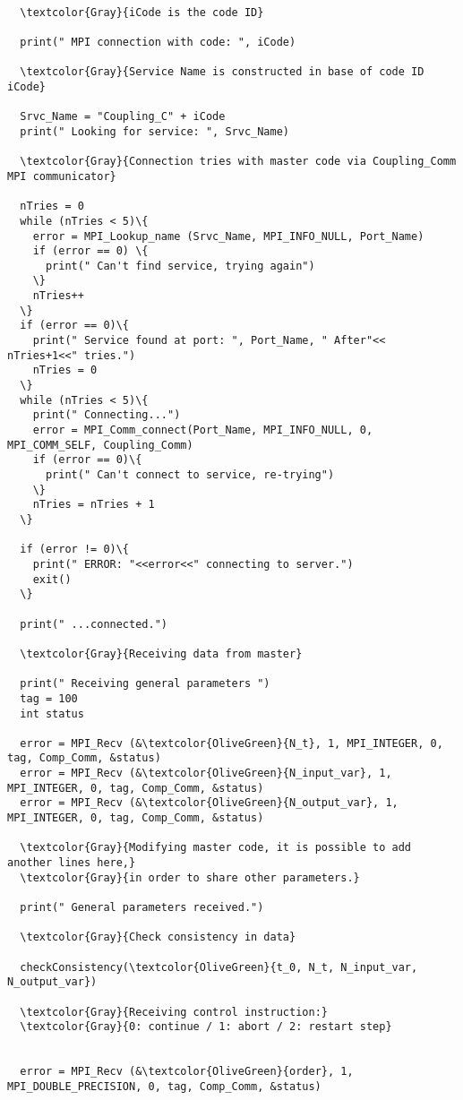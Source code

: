 \begin{Verbatim}[frame=single,commandchars=\\\{\}]

  \textcolor{Gray}{iCode is the code ID}
  
  print(" MPI connection with code: ", iCode)

  \textcolor{Gray}{Service Name is constructed in base of code ID iCode}
  
  Srvc_Name = "Coupling_C" + iCode
  print(" Looking for service: ", Srvc_Name)

  \textcolor{Gray}{Connection tries with master code via Coupling_Comm MPI communicator}
  
  nTries = 0
  while (nTries < 5)\{
    error = MPI_Lookup_name (Srvc_Name, MPI_INFO_NULL, Port_Name)
    if (error == 0) \{
      print(" Can't find service, trying again")
    \}
    nTries++
  \}
  if (error == 0)\{
    print(" Service found at port: ", Port_Name, " After"<< nTries+1<<" tries.")
    nTries = 0
  \}
  while (nTries < 5)\{
    print(" Connecting...")
    error = MPI_Comm_connect(Port_Name, MPI_INFO_NULL, 0, MPI_COMM_SELF, Coupling_Comm)
    if (error == 0)\{
      print(" Can't connect to service, re-trying")
    \}
    nTries = nTries + 1
  \}

  if (error != 0)\{
    print(" ERROR: "<<error<<" connecting to server.")
    exit()
  \}

  print(" ...connected.")

  \textcolor{Gray}{Receiving data from master}

  print(" Receiving general parameters ")  
  tag = 100
  int status
  
  error = MPI_Recv (&\textcolor{OliveGreen}{N_t}, 1, MPI_INTEGER, 0, tag, Comp_Comm, &status)
  error = MPI_Recv (&\textcolor{OliveGreen}{N_input_var}, 1, MPI_INTEGER, 0, tag, Comp_Comm, &status)
  error = MPI_Recv (&\textcolor{OliveGreen}{N_output_var}, 1, MPI_INTEGER, 0, tag, Comp_Comm, &status)

  \textcolor{Gray}{Modifying master code, it is possible to add another lines here,}
  \textcolor{Gray}{in order to share other parameters.}    
    
  print(" General parameters received.")

  \textcolor{Gray}{Check consistency in data}

  checkConsistency(\textcolor{OliveGreen}{t_0, N_t, N_input_var, N_output_var})
  
  \textcolor{Gray}{Receiving control instruction:}
  \textcolor{Gray}{0: continue / 1: abort / 2: restart step}


  error = MPI_Recv (&\textcolor{OliveGreen}{order}, 1, MPI_DOUBLE_PRECISION, 0, tag, Comp_Comm, &status)

\end{Verbatim}


